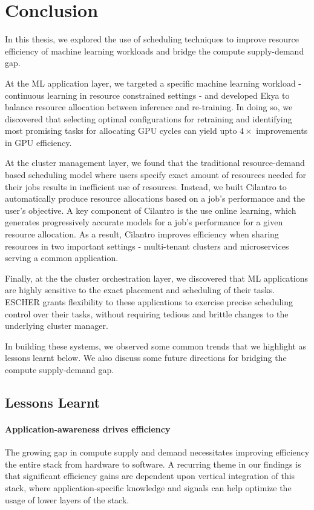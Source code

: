 \chapter{Conclusion}
\label{ch_conclusion}

In this thesis, we explored the use of scheduling techniques to improve resource efficiency of machine learning workloads and bridge the compute supply-demand gap.

At the ML application layer, we targeted a specific machine learning workload - continuous learning in resource constrained settings - and developed Ekya to balance resource allocation between inference and re-training. In doing so, we discovered that selecting optimal configurations for retraining and identifying most promising tasks for allocating GPU cycles can yield upto $4\times$ improvements in GPU efficiency.

At the cluster management layer, we found that the traditional resource-demand based scheduling model where users specify exact amount of resources needed for their jobs results in inefficient use of resources. Instead, we built Cilantro to automatically produce resource allocations based on a job's performance and the user's objective. A key component of Cilantro is the use online learning, which generates progressively accurate models for a job's performance for a given resource allocation. As a result, Cilantro improves efficiency when sharing resources in two important settings - multi-tenant clusters and microservices serving a common application. 

Finally, at the the cluster orchestration layer, we discovered that ML applications are highly sensitive to the exact placement and scheduling of their tasks. ESCHER grants flexibility to these applications to exercise precise scheduling control over their tasks, without requiring tedious and brittle changes to the underlying cluster manager.

In building these systems, we observed some common trends that we highlight as lessons learnt below. We also discuss some future directions for bridging the compute supply-demand gap.

\section{Lessons Learnt}

\subsubsection{Application-awareness drives efficiency}
The growing gap in compute supply and demand necessitates improving efficiency the entire stack from hardware to software. A recurring theme in our findings is that significant efficiency gains are dependent upon vertical integration of this stack, where application-specific knowledge and signals can help optimize the usage of lower layers of the stack.


